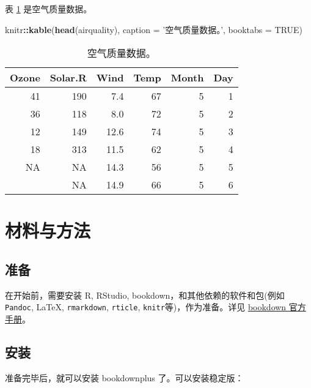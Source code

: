 \documentclass[singlesided]{Style/ucasthesis}%
\newenvironment{Shaded}{\begin{snugshade}}{\end{snugshade}}
\newcommand{\KeywordTok}[1]{\textcolor[rgb]{0.13,0.29,0.53}{\textbf{{#1}}}}
\newcommand{\DataTypeTok}[1]{\textcolor[rgb]{0.13,0.29,0.53}{{#1}}}
\newcommand{\StringTok}[1]{\textcolor[rgb]{0.31,0.60,0.02}{{#1}}}
\newcommand{\OtherTok}[1]{\textcolor[rgb]{0.56,0.35,0.01}{{#1}}}
\newcommand{\OperatorTok}[1]{\textcolor[rgb]{0.81,0.36,0.00}{\textbf{{#1}}}}
\newcommand{\NormalTok}[1]{{#1}}
\begin{document}
表 \ref{tab:tabair} 是空气质量数据。

\begin{Shaded}
\begin{Highlighting}[]
\NormalTok{knitr}\OperatorTok{::}\KeywordTok{kable}\NormalTok{(}\KeywordTok{head}\NormalTok{(airquality), }\DataTypeTok{caption =} \StringTok{'空气质量数据。'}\NormalTok{,}
                   \DataTypeTok{booktabs =} \OtherTok{TRUE}\NormalTok{)}
\end{Highlighting}
\end{Shaded}

\begin{table}[t]

\caption{\label{tab:tabair}空气质量数据。}
\centering
\begin{tabular}{rrrrrr}
\toprule
Ozone & Solar.R & Wind & Temp & Month & Day\\
\midrule
41 & 190 & 7.4 & 67 & 5 & 1\\
36 & 118 & 8.0 & 72 & 5 & 2\\
12 & 149 & 12.6 & 74 & 5 & 3\\
18 & 313 & 11.5 & 62 & 5 & 4\\
NA & NA & 14.3 & 56 & 5 & 5\\
\addlinespace
28 & NA & 14.9 & 66 & 5 & 6\\
\bottomrule
\end{tabular}
\end{table}

\hypertarget{section-1}{%
\chapter{材料与方法}\label{section-1}}

\hypertarget{section-2}{%
\section{准备}\label{section-2}}

在开始前，需要安装 R, RStudio, bookdown，和其他依赖的软件和包(例如 \texttt{Pandoc}, LaTeX, \texttt{rmarkdown}, \texttt{rticle}, \texttt{knitr}等)，作为准备。详见 \href{https://bookdown.org/yihui/bookdown/}{bookdown 官方手册}。

\hypertarget{section-3}{%
\section{安装}\label{section-3}}

准备完毕后，就可以安装 bookdownplus 了。可以安装稳定版：
\end{document}
